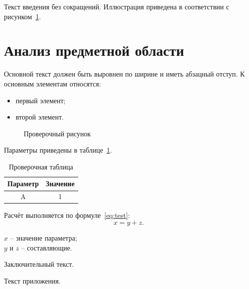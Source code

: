 \documentclass[
  numbers=section,
  document-code={ВКРБ-09.03.04-10.19-03-24-81}
]{../fqw}
\begin{document}
\FqwEnableDocumentCodeHeader

\tableofcontents


Текст введения без сокращений. Иллюстрация приведена в соответствии с рисунком~\ref{fig:test}.

\section{Анализ предметной области}

Основной текст должен быть выровнен по ширине и иметь абзацный отступ.
К основным элементам относятся:
\begin{itemize}
\item первый элемент;
\item второй элемент.
\end{itemize}

\begin{figure}[H]
  \centering
  \fbox{\rule{0pt}{20mm}\rule{40mm}{0pt}}
  \caption{Проверочный рисунок}
  \label{fig:test}
\end{figure}

Параметры приведены в таблице~\ref{tab:test}.

\begin{table}[H]
  \caption{Проверочная таблица}
  \label{tab:test}
  \centering
  \begin{tabular}{|c|c|}
    \hline
    Параметр & Значение \\
    \hline
    A & 1 \\
    \hline
  \end{tabular}
\end{table}

Расчёт выполняется по формуле~\eqref{eq:test}:
\begin{equation}
  x = y + z.
  \label{eq:test}
\end{equation}
\begin{FqwWhere}
  $x$ -- значение параметра; \\
  $y$ и $z$ -- составляющие.
\end{FqwWhere}


Заключительный текст.

\appendix
{}

Текст приложения.
\end{document}
